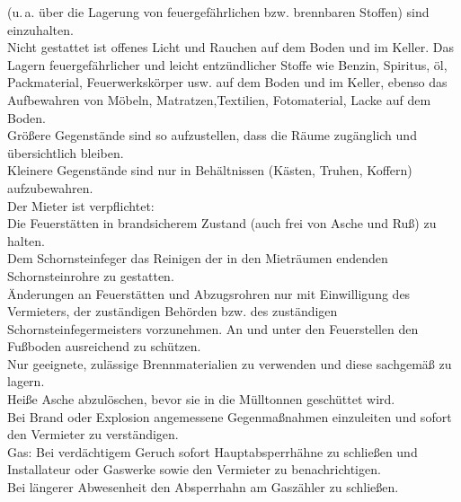 \documentclass{scrreprt}[12pt,a4paper,twoside,duplex]
\begin{document}
\begin{contract}
\begin{multicols}{2}
\begin{description}[style=unboxed,leftmargin=0cm]
    (u.\,a. über die Lagerung von feuergefährlichen bzw. brennbaren Stoffen)
    sind einzuhalten.\\
    Nicht gestattet ist offenes Licht und Rauchen auf dem Boden und im Keller.
    Das Lagern feuergefährlicher und leicht entzündlicher Stoffe wie Benzin,
    Spiritus, öl, Packmaterial, Feuerwerkskörper usw. auf dem Boden und im
    Keller, ebenso das Aufbewahren von Möbeln, Matratzen,Textilien,
    Fotomaterial, Lacke auf dem Boden.\\
    Größere Gegenstände sind so aufzustellen, dass die Räume zugänglich und
    übersichtlich bleiben.\\
    Kleinere Gegenstände sind nur in Behältnissen (Kästen, Truhen, Koffern)
    aufzubewahren.\\
    Der Mieter ist verpflichtet:\\
    Die Feuerstätten in brandsicherem Zustand (auch frei von Asche und Ruß) zu
    halten.\\
    Dem Schornsteinfeger das Reinigen der in den Mieträumen endenden
    Schornsteinrohre zu gestatten.\\
    Änderungen an Feuerstätten und Abzugsrohren nur mit Einwilligung des
    Vermieters, der zuständigen Behörden bzw. des zuständigen
    Schornsteinfegermeisters vorzunehmen. An und unter den Feuerstellen den
    Fußboden ausreichend zu schützen.\\
    Nur geeignete, zulässige Brennmaterialien zu verwenden und diese sachgemäß
    zu lagern.\\
    Heiße Asche abzulöschen, bevor sie in die Mülltonnen geschüttet wird.\\
    Bei Brand oder Explosion angemessene Gegenmaßnahmen einzuleiten und sofort
    den Vermieter zu verständigen.\\
    Gas: Bei verdächtigem Geruch sofort Hauptabsperrhähne zu schließen und
    Installateur oder Gaswerke sowie den Vermieter zu benachrichtigen.\\
    Bei längerer Abwesenheit den Absperrhahn am Gaszähler zu schließen.
    \end{description}
\end{multicols}
\end{contract}
\end{document}
